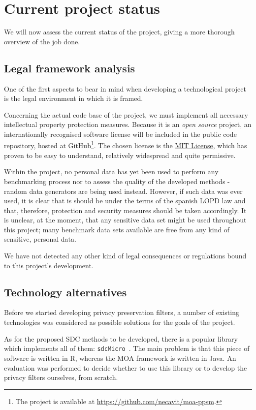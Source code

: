 \section{Current project status}

We will now assess the current status of the project, giving a more thorough overview of the job done.

\subsection{Legal framework analysis}

One of the first aspects to bear in mind when developing a technological project is the legal environment in which it is framed.

Concerning the actual code base of the project, we must implement all necessary intellectual property protection measures. Because it is an \textit{open source} project, an internationally recognised software license will be included in the public code repository, hosted at GitHub\footnote{The project is available at \url{https://github.com/necavit/moa-ppsm}.}. The chosen license is the \href{http://opensource.org/licenses/MIT}{MIT License}, which has proven to be easy to understand, relatively widespread and quite permissive.

Within the project, no personal data has yet been used to perform any benchmarking process nor to assess the quality of the developed methods - random data generators are being used instead. However, if such data was ever used, it is clear that is should be under the terms of the spanish LOPD law and that, therefore, protection and security measures should be taken accordingly. It is unclear, at the moment, that any sensitive data set might be used throughout this project; many benchmark data sets available are free from any kind of sensitive, personal data.

We have not detected any other kind of legal consequences or regulations bound to this project's development.

\subsection{Technology alternatives}

Before we started developing privacy preservation filters, a number of existing technologies was considered as possible solutions for the goals of the project.

As for the proposed SDC methods to be developed, there is a popular library which implements all of them: \texttt{sdcMicro}~\cite{sdcMicro}. The main problem is that this piece of software is written in R, whereas the MOA framework is written in Java. An evaluation was performed to decide whether to use this library or to develop the privacy filters ourselves, from scratch.

